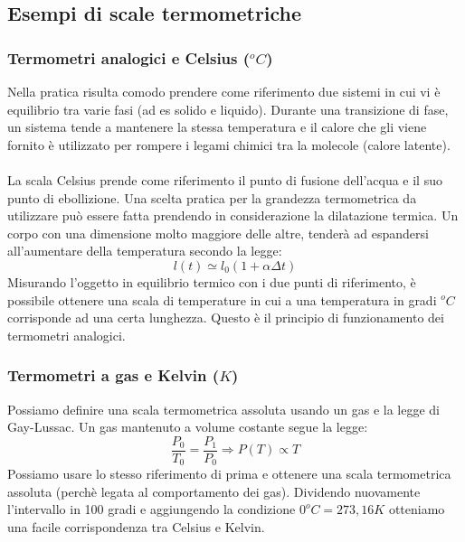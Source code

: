 \documentclass{article}
\begin{document}
\subsection{Esempi di scale termometriche}
\subsubsection{Termometri analogici e Celsius ($^oC$)}
Nella pratica risulta comodo prendere come riferimento due sistemi in cui vi è equilibrio tra varie fasi (ad es solido e liquido). Durante una transizione di fase, un sistema tende a mantenere la stessa temperatura e il calore che gli viene fornito è utilizzato per rompere i legami chimici tra la molecole (calore latente).\\\\
La scala Celsius prende come riferimento il punto di fusione dell'acqua e il suo punto di ebollizione. Una scelta pratica per la grandezza termometrica da utilizzare può essere fatta prendendo in considerazione la dilatazione termica. Un corpo con una dimensione molto maggiore delle altre, tenderà ad espandersi all'aumentare della temperatura secondo la legge:
$$ l(t)\simeq l_0(1+\alpha\Delta t) $$
Misurando l'oggetto in equilibrio termico con i due punti di riferimento, è possibile ottenere una scala di temperature in cui a una temperatura in gradi $^oC$ corrisponde ad una certa lunghezza. Questo è il principio di funzionamento dei termometri analogici.

\subsubsection{Termometri a gas e Kelvin ($K$)}
Possiamo definire una scala termometrica assoluta usando un gas e la legge di Gay-Lussac. Un gas mantenuto a volume costante segue la legge:
$$ \frac{P_0}{T_0}=\frac{P_1}{P_0} \Rightarrow P(T) \propto T $$
Possiamo usare lo stesso riferimento di prima e ottenere una scala termometrica assoluta (perchè legata al comportamento dei gas). Dividendo nuovamente l'intervallo in 100 gradi e aggiungendo la condizione $0^oC=273,16K$ otteniamo una facile corrispondenza tra Celsius e Kelvin.
\end{document}
